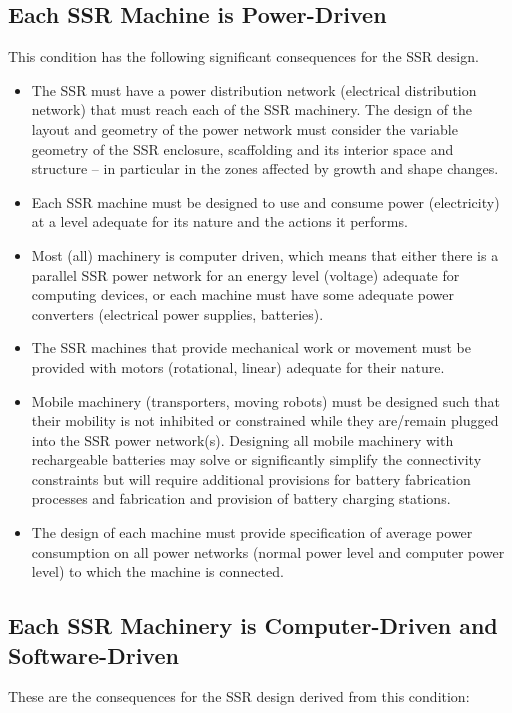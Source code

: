 \documentclass[letterpaper]{article}
\begin{document}
\bigskip

\subsection[Each SSR Machine is Power{}-Driven]{Each SSR Machine is
Power-Driven}
\hypertarget{RefHeading3130306210128}{}This condition has the following
significant consequences for the SSR design.


\bigskip

\begin{itemize}
\item The SSR must have a power distribution network (electrical
distribution network) that must reach each of the SSR machinery. The
design of the layout and geometry of the power network must consider
the variable geometry of the SSR enclosure, scaffolding and its
interior space and structure – in particular in the zones affected by
growth and shape changes.
\item Each SSR machine must be designed to use and consume power
(electricity) at a level adequate for its nature and the actions it
performs. 
\item Most (all) machinery is computer driven, which means that either
there is a parallel SSR power network for an energy level (voltage)
adequate for computing devices, or each machine must have some adequate
power converters (electrical power supplies, batteries).
\item The SSR machines that provide mechanical work or movement must be
provided with motors (rotational, linear) adequate for their nature.
\item Mobile machinery (transporters, moving robots) must be designed
such that their mobility is not inhibited or constrained while they
are/remain plugged into the SSR power network(s).  Designing all mobile
machinery with rechargeable batteries may solve or significantly
simplify the connectivity constraints but will require additional
provisions for battery fabrication processes and fabrication and
provision of battery charging stations.
\item The design of each machine must provide specification of average
power consumption on all power networks (normal power level and
computer power level) to which the machine is connected.
\end{itemize}
\subsection[Each SSR Machinery is Computer{}-Driven and
Software{}-Driven]{Each SSR Machinery is Computer-Driven and
Software-Driven}
\hypertarget{RefHeading3132306210128}{}These are the consequences for
the SSR design derived from this condition:
\end{document}
